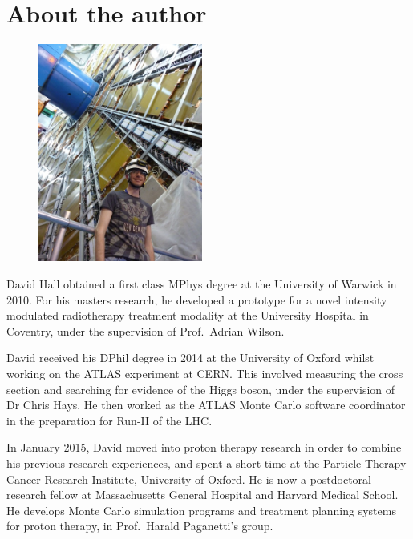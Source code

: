 
\chapter*{About the author}

\begin{figure}
	\vspace{-20pt}
	\centering
	\includegraphics[width=0.48\textwidth]{tex/david_photo}
	\vspace{-20pt}
\end{figure}

David Hall obtained a first class MPhys degree at the University of Warwick in 2010. For his 
masters research, he developed a prototype for a novel intensity modulated radiotherapy 
treatment modality at the University Hospital in Coventry, under the supervision of Prof.\ 
Adrian Wilson.

David received his DPhil degree in 2014 at the University of Oxford whilst working on the 
ATLAS experiment at CERN. This involved measuring the \WW cross section and searching for 
evidence of the Higgs boson, under the supervision of Dr Chris Hays. He then worked as the 
ATLAS Monte Carlo software coordinator in the preparation for Run-II of the LHC.

In January 2015, David moved into proton therapy research in order to combine his previous 
research experiences, and spent a short time at the Particle Therapy Cancer Research 
Institute, University of Oxford. He is now a postdoctoral research fellow at Massachusetts 
General Hospital and Harvard Medical School. He develops Monte Carlo simulation programs and 
treatment planning systems for proton therapy, in Prof.\ Harald Paganetti's group.

\nocite{HWW-RunI-submit,ATLAS:combination:2013,YR3,ATLAS-discovery,WW-7TeV,WW-1ifb,VersatileLinkConnectors,VersatileLinkFibres,VersatileLink}

\let\oldbibname\bibname
\renewcommand{\bibname}{Selected publications}


\let\bibname\oldbibname
